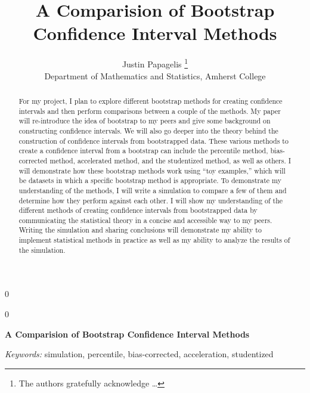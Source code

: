 \documentclass[12pt]{article}
\newcommand{\blind}{0}
\begin{document}
\def\spacingset#1{\renewcommand{\baselinestretch}%
{#1}\small\normalsize} \spacingset{1}



\blind
{
  \title{\bf A Comparision of Bootstrap Confidence Interval Methods}

  \author{
        Justin Papagelis \thanks{The authors gratefully acknowledge
\ldots{}} \\
    Department of Mathematics and Statistics, Amherst College\\
      }
  \maketitle
} \fi

\blind
{
  \bigskip
  \bigskip
  \bigskip
  \begin{center}
    {\LARGE\bf A Comparision of Bootstrap Confidence Interval Methods}
  \end{center}
  \medskip
} \fi

\bigskip
\begin{abstract}
For my project, I plan to explore different bootstrap methods for
creating confidence intervals and then perform comparisons between a
couple of the methods. My paper will re-introduce the idea of bootstrap
to my peers and give some background on constructing confidence
intervals. We will also go deeper into the theory behind the
construction of confidence intervals from bootstrapped data. These
various methods to create a confidence interval from a bootstrap can
include the percentile method, bias-corrected method, accelerated
method, and the studentized method, as well as others. I will
demonstrate how these bootstrap methods work using ``toy examples,''
which will be datasets in which a specific bootstrap method is
appropriate. To demonstrate my understanding of the methods, I will
write a simulation to compare a few of them and determine how they
perform against each other. I will show my understanding of the
different methods of creating confidence intervals from bootstrapped
data by communicating the statistical theory in a concise and accessible
way to my peers. Writing the simulation and sharing conclusions will
demonstrate my ability to implement statistical methods in practice as
well as my ability to analyze the results of the simulation.
\end{abstract}

\noindent%
{\it Keywords:} simulation, percentile, bias-corrected, acceleration, studentized
\vfill
\end{document}
